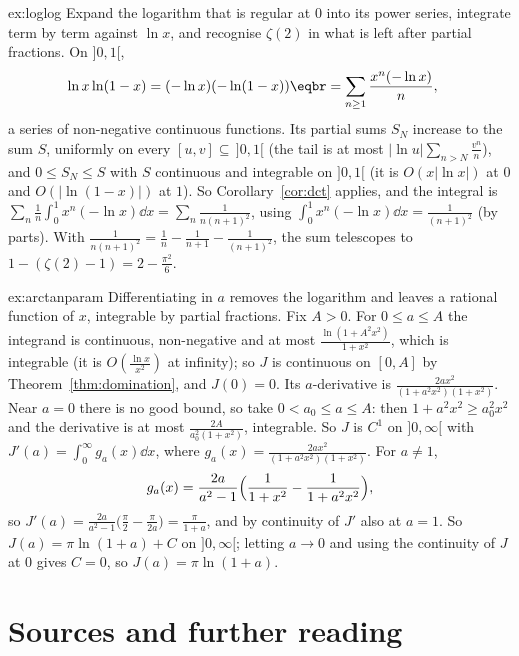\begin{solution}{ex:loglog}
\idea Expand the logarithm that is regular at $0$ into its power series, integrate term by term against $\ln x$, and recognise
$\zeta(2)$ in what is left after partial fractions.
\writeup On $]0,1[$,
\[
\begin{aligned}\ln x\ln(1-x)&=(-\ln x)(-\ln(1-x))\eqbr=\sum_{n\ge1}\frac{x^n(-\ln x)}n,\end{aligned}
\]
a series of non-negative continuous functions. Its partial sums $S_N$ increase to the sum $S$, uniformly on every $[u,v]\subseteq\,]0,1[$ (the tail is at most
$|\ln u|\sum_{n>N}\frac{v^n}n$), and $0\le S_N\le S$ with $S$ continuous and integrable on $]0,1[$ (it is $O(x|\ln x|)$ at $0$ and $O(|\ln(1-x)|)$
at $1$). So Corollary~\ref{cor:dct} applies, and the integral is $\sum_n\frac1n\int_0^1x^n(-\ln x)\dd x=\sum_n\frac1{n(n+1)^2}$, using $\int_0^1x^n(-\ln x)\dd x=\frac1{(n+1)^2}$ (by parts).
With $\frac1{n(n+1)^2}=\frac1n-\frac1{n+1}-\frac1{(n+1)^2}$, the sum telescopes to $1-(\zeta(2)-1)=2-\frac{\pi^2}6$.
\end{solution}

\begin{solution}{ex:arctanparam}
\idea Differentiating in $a$ removes the logarithm and leaves a rational function of $x$, integrable by partial fractions.
\writeup Fix $A>0$. For $0\le a\le A$ the integrand is continuous, non-negative and at most $\frac{\ln(1+A^2x^2)}{1+x^2}$, which is
integrable (it is $O(\frac{\ln x}{x^2})$ at infinity); so $J$ is continuous on $[0,A]$ by Theorem~\ref{thm:domination}, and $J(0)=0$.
Its $a$-derivative is $\frac{2ax^2}{(1+a^2x^2)(1+x^2)}$. Near $a=0$ there is no good bound, so take $0<a_0\le a\le A$: then
$1+a^2x^2\ge a_0^2x^2$ and the derivative is at most $\frac{2A}{a_0^2(1+x^2)}$, integrable. So $J$ is $C^1$ on $]0,\infty[$ with
$J'(a)=\int_0^\infty g_a(x)\dd x$, where $g_a(x)=\frac{2ax^2}{(1+a^2x^2)(1+x^2)}$. For $a\ne1$,
\[
g_a(x)=\frac{2a}{a^2-1}\Bigl(\frac1{1+x^2}-\frac1{1+a^2x^2}\Bigr),
\]
so $J'(a)=\frac{2a}{a^2-1}\bigl(\frac\pi2-\frac\pi{2a}\bigr)=\frac\pi{1+a}$, and by continuity of $J'$ also at $a=1$. So $J(a)=\pi\ln(1+a)+C$ on
$]0,\infty[$; letting $a\to0$ and using the continuity of $J$ at $0$ gives $C=0$, so $J(a)=\pi\ln(1+a)$.
\end{solution}

\section*{Sources and further reading}

